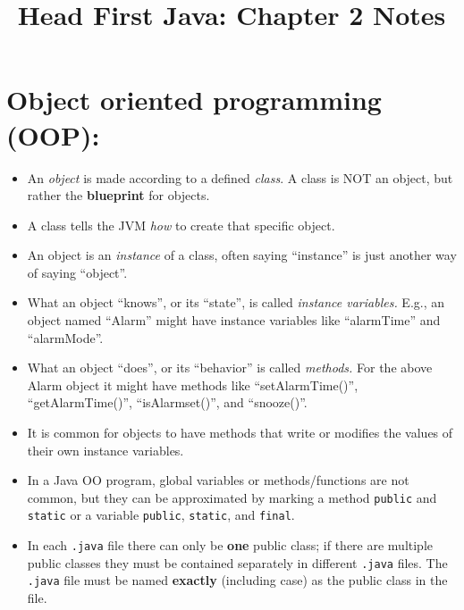 \documentclass{tufte-handout}
\title{Head First Java: Chapter 2 Notes}
\begin{document}
    \maketitle

    \section*{Object oriented programming (OOP):}
    \begin{itemize}
        \item An \emph{object} is made according to a defined \emph{class}. A class is NOT an object, but rather the \textbf{blueprint} for objects.
        \item A class tells the JVM \emph{how} to create that specific object.
        \item An object is an \emph{instance} of a class, often saying ``instance'' is just another way of saying ``object''.
        \item What an object ``knows'', or its ``state'', is called \emph{instance variables.} E.g., an object named ``Alarm'' might have instance variables like ``alarmTime'' and ``alarmMode''.
        \item What an object ``does'', or its ``behavior'' is called \emph{methods.} For the above Alarm object it might have methods like ``setAlarmTime()'', ``getAlarmTime()'', ``isAlarmset()'', and ``snooze()''.
        \item It is common for objects to have methods that write or modifies the values of their own instance variables.
        \item In a Java OO program, global variables or methods/functions are not common, but they can be approximated by marking a method \texttt{public} and \texttt{static} or a variable \texttt{public}, \texttt{static}, and \texttt{final}.
        \item In each \texttt{.java} file there can only be \textbf{one} public class; if there are multiple public classes they must be contained separately in different \texttt{.java} files. The \texttt{.java} file must be named \textbf{exactly} (including case) as the public class in the file.
    \end{itemize}
    
\end{document}

